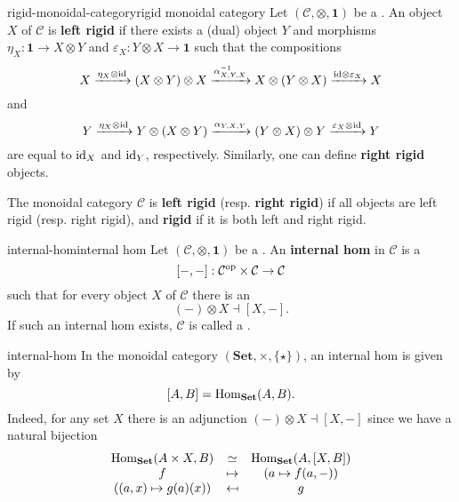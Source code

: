 \begin{topic}{rigid-monoidal-category}{rigid monoidal category}
    Let $(\mathcal{C}, \otimes, \textbf{1})$ be a . An object $X$ of $\mathcal{C}$ is \textbf{left rigid} if there exists a (dual) object $Y$ and morphisms $\eta_X : \textbf{1} \to X \otimes Y$ and $\varepsilon_X : Y \otimes X \to \textbf{1}$ such that the compositions
    \[ X \xrightarrow{\eta_X \otimes \text{id}} (X \otimes Y) \otimes X \xrightarrow{\alpha_{X, Y, X}^{-1}} X \otimes (Y \otimes X) \xrightarrow{\text{id} \otimes \varepsilon_X} X \]
    and
    \[ Y \xrightarrow{\eta_X \otimes \text{id}} Y \otimes (X \otimes Y) \xrightarrow{\alpha_{Y, X, Y}} (Y \otimes X) \otimes Y \xrightarrow{\varepsilon_X \otimes \text{id}} Y \]
    are equal to $\text{id}_X$ and $\text{id}_Y$, respectively. Similarly, one can define \textbf{right rigid} objects.
    
    The monoidal category $\mathcal{C}$ is \textbf{left rigid} (resp. \textbf{right rigid}) if all objects are left rigid (resp. right rigid), and \textbf{rigid} if it is both left and right rigid.
\end{topic}

\begin{topic}{internal-hom}{internal hom}
    Let $(\mathcal{C}, \otimes, \textbf{1})$ be a  . An \textbf{internal hom} in $\mathcal{C}$ is a 
    \[ [-, -] : \mathcal{C}^\textup{op} \times \mathcal{C} \to \mathcal{C} \]
    such that for every object $X$ of $\mathcal{C}$ there is an 
    \[ (-) \otimes X \dashv [X, -] . \]
    If such an internal hom exists, $\mathcal{C}$ is called a .
\end{topic}

\begin{example}{internal-hom}
    In the monoidal category $(\textbf{Set}, \times, \{ \star \})$, an internal hom is given by
    \[ [A, B] = \text{Hom}_\textbf{Set}(A, B) . \]
    Indeed, for any set $X$ there is an adjunction $(-) \otimes X \dashv [X, -]$ since we have a natural bijection
    \[ \begin{array}{ccc}
        \text{Hom}_\textbf{Set}(A \times X, B) & \simeq & \text{Hom}_\textbf{Set}(A, [X, B]) \\
        f & \mapsto & (a \mapsto f(a, -)) \\
        ((a, x) \mapsto g(a)(x)) & \mapsfrom & g
    \end{array} \]
\end{example}

